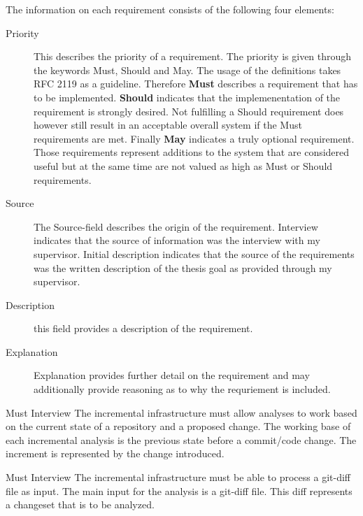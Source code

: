 \documentclass[a4paper]{article}
\begin{document}
The information on each requirement consists of the following four elements:

\begin{description}
    \item [Priority]
	This describes the priority of a requirement. The priority is given through the keywords Must, Should and May. The usage of the definitions takes RFC 2119 \cite{RFC-bum} as a guideline. Therefore \textbf{Must} describes a requirement that has to be implemented. \textbf{Should} indicates that the implemenentation of the requirement is strongly desired. Not fulfilling a Should requirement  does however still result in an acceptable overall system if the Must requirements are met. Finally \textbf{May} indicates a truly optional requirement. Those requirements represent additions to the system that are considered useful but at the same time are not valued as high as Must or Should requirements.
    \item [Source]
    The Source-field describes the origin of the requirement. Interview indicates that the source of information was the interview with my supervisor. Initial description indicates that the source of the requirements was the written description of the thesis goal as provided through my supervisor.
    \item [Description]
    this field provides a description of the requirement.
    \item [Explanation]
    Explanation provides further detail on the requirement and may additionally provide reasoning as to why the requriement is included.
\end{description}

\begin{req} \label{req:working-base}
	\reqtable
	{Must}  {Interview}
	{The incremental infrastructure must allow analyses to work based on the current state of a repository and a proposed change.}
	{The working base of each incremental analysis is the previous state before a commit/code change. The increment is represented by the change introduced.}
	
	\begin{subreq} \label{req:git-diff}
		\reqtable
		{Must}  {Interview}
		{The incremental infrastructure must be able to process a git-diff file as input.}
		{The main input for the analysis is a git-diff file. This diff represents a changeset that is to be analyzed.}
	\end{subreq}
\end{req}
\end{document}
